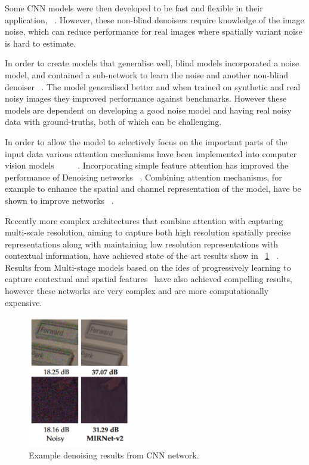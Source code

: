 \documentclass[project-plan]{report-template}
\begin{document}
Some CNN models were then developed to be fast and flexible in their application, ~\cite{zhang2018ffdnet}. However, these non-blind denoisers require knowledge of the image noise, which can reduce performance for real images where spatially variant noise is hard to estimate.  

In order to create models that generalise well, blind models incorporated a noise model, and contained a sub-network to learn the noise and another non-blind denoiser ~\cite{Guo2019Cbdnet}. The model generalised better and when trained on synthetic and real noisy images they improved performance against benchmarks. However these models are dependent on developing a good noise model and having real noisy data with ground-truths, both of which can be challenging.

In order to allow the model to selectively focus on the important parts of the input data various attention mechanisms have been implemented into computer vision models ~\cite{wang2017residual}~\cite{hu2018senet}~\cite{woo2018cbam}~\cite{wang2020eca}~\cite{hou2021coordinate}. Incorporating simple feature attention has improved the performance of Denoising networks ~\cite{anwar2019rid}. Combining attention mechanisms, for example to enhance the spatial and channel representation of the model, have be shown to improve networks ~\cite{cai2023cbamdncnn}.

Recently more complex architectures that combine attention with capturing multi-scale resolution, aiming to capture both high resolution spatially precise representations along with maintaining low resolution representations with contextual information, have achieved state of the art results show in ~\ref{fig:example} ~\cite{zamir2020MIRNet}. Results from Multi-stage models based on the ides of progressively learning to capture contextual and spatial features~\cite{zamir2021MPRNet} have also achieved compelling results, however these networks are very complex and are more computationally expensive.

\begin{figure}[htb]
    \begin{center}
        \includegraphics[width=0.4\textwidth]{latex/figures/noise_removal_ex.png}
    \end{center}
    \caption{\label{fig:example} Example denoising results from CNN network.}
\end{figure}
\end{document}
